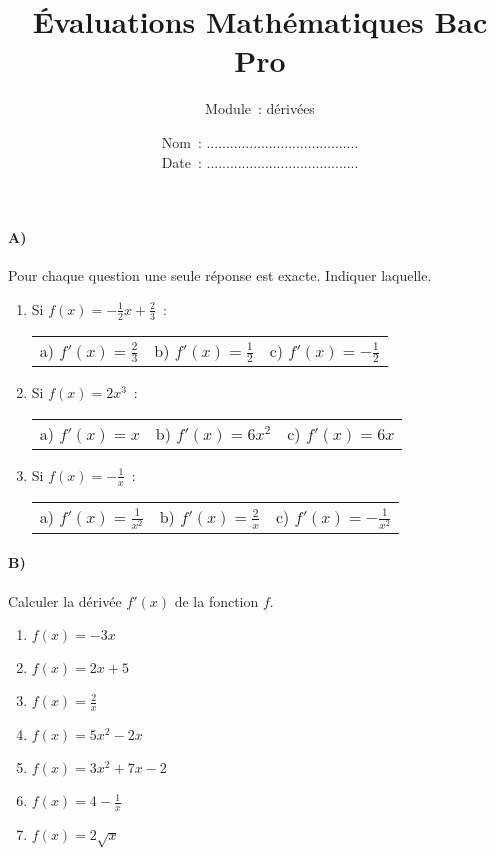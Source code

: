 \documentclass[a4paper]{article}
\begin{document}
  \title{Évaluations Mathématiques Bac Pro}
  \author{Module~: dérivées}
  \date{
    Nom~: .......................................\\
    \vspace{0.2cm}
    Date~: .......................................}
  \maketitle
  
  \paragraph{A)}
  Pour chaque question une seule réponse est exacte. Indiquer laquelle.
  \begin{enumerate}
    \item
      Si $\displaystyle f(x) = - \frac{1}{2} x + \frac{2}{3}$~:
      \begin{center}
        \begin{tabular}{p{3cm}p{3cm}p{3cm}}
          a) $\displaystyle f'(x) = \frac{2}{3}$ & b) $\displaystyle f'(x) = \frac{1}{2}$ & c) $\displaystyle f'(x) = - \frac{1}{2}$
        \end{tabular}
      \end{center}

    \item
      Si $f(x) = 2 x^3$~:
      \begin{center}
        \begin{tabular}{p{3cm}p{3cm}p{3cm}}
          a) $f'(x) = x$ & b) $f'(x) = 6 x^2$ & c) $f'(x) = 6x$
        \end{tabular}
      \end{center}

    \item
      Si $\displaystyle f(x) = - \frac{1}{x}$~:
      \begin{center}
        \begin{tabular}{p{3cm}p{3cm}p{3cm}}
          a) $\displaystyle f'(x) = \frac{1}{x^2}$ & b) $\displaystyle f'(x) = \frac{2}{x}$ & c) $\displaystyle f'(x) = - \frac{1}{x^2}$
        \end{tabular}
      \end{center}
  \end{enumerate}

  \paragraph{B)}
  Calculer la dérivée $f'(x)$ de la fonction $f$.
  \begin{enumerate}
    \item $f(x) = - 3 x$
    \item $f(x) = 2x + 5$
    \item $\displaystyle f(x) = \frac{2}{x}$
    \item $f(x) = 5 x^2 - 2x$
    \item $f(x) = 3 x^2 + 7x - 2$
    \item $\displaystyle f(x) = 4 - \frac{1}{x}$
    \item $f(x) = 2 \sqrt{x}$
  \end{enumerate}
\end{document}
